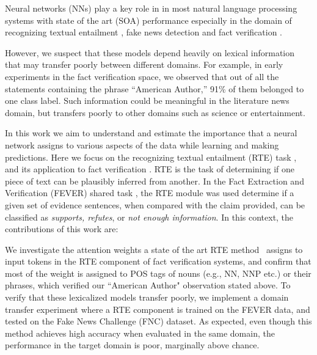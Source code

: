 \documentclass[conference,onecolumn]{IEEEtran}
\begin{document}
Neural networks (NNs)  play a key role in in most natural language processing systems with state of the art (SOA) performance \citep{devlin2018bert, sun2018improving,bohnet2018morphosyntactic} especially in the domain of recognizing textual entailment \citep{kim2018semantic}, fake news detection \citep{baird2017talos} and fact verification \citep{nie2018combining}.

However, we suspect that these models depend heavily on lexical information that may transfer poorly between different domains. For example, in early experiments in the fact verification space, we observed that out of all the statements containing the phrase ``American Author,'' 91\% of them belonged to one class label. Such information could be meaningful in the literature news domain, but transfers poorly to other domains such as science or entertainment. 

In this work we aim to understand and estimate the importance that a neural network assigns to various aspects of the data while learning and making predictions. Here we focus on the recognizing textual entailment (RTE) task \citep{dagan2013recognizing}, and its application to fact verification \citep{thorne2018fever}.
RTE is the task of determining if one piece of text can be plausibly inferred from another. In the Fact Extraction and Verification (FEVER) shared task \cite{thorne2018fever}, the RTE module was used determine if a given set of evidence sentences, when compared with the claim provided, can be classified as \textit{supports, refutes}, or \textit{not enough information}.
In this context, the contributions of this work are:




{\flushleft {}}

{} We investigate the attention weights a state of the art RTE method~\cite{parikh2016decomposable} assigns to input tokens in the RTE component of fact verification systems, and confirm that most of the weight is assigned to POS tags of nouns (e.g., NN, NNP etc.) or their phrases, which verified our ``American Author" observation stated above.
{}  To verify that these lexicalized models transfer poorly, we implement a domain transfer experiment where a RTE component is trained on the FEVER data, and tested on the Fake News Challenge (FNC) \citep{pomerleau2017fake} dataset. As expected, even though this method achieves high accuracy when evaluated in the same domain, the performance in the target domain is poor, marginally above chance.
\end{document}
